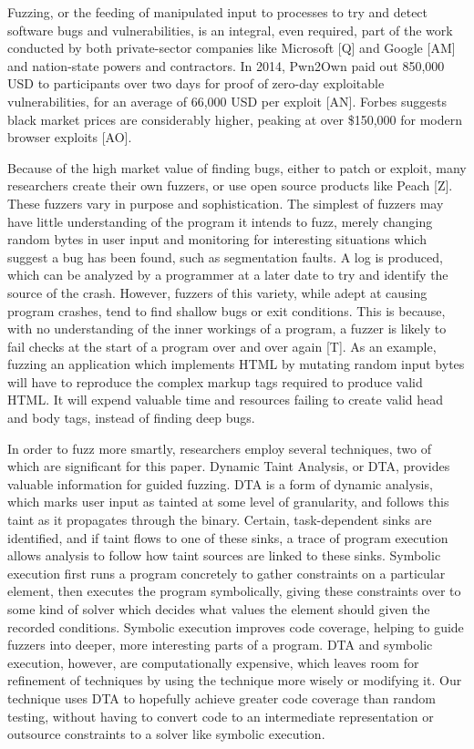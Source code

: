 \documentclass[11pt,expanded,copyright]{fsuthesis}
\begin{document}
Fuzzing, or the feeding of manipulated input to processes to try and detect software bugs and vulnerabilities, is an integral, even required, part of the work conducted by both private-sector companies like Microsoft [Q] and Google [AM] and nation-state powers and contractors. In 2014, Pwn2Own paid out 850,000 USD to participants over two days for proof of zero-day exploitable vulnerabilities, for an average of 66,000 USD per exploit [AN]. Forbes suggests black market prices are considerably higher, peaking at over \$150,000 for modern browser exploits [AO].

Because of the high market value of finding bugs, either to patch or exploit, many researchers create their own fuzzers, or use open source products like Peach [Z]. These fuzzers vary in purpose and sophistication. The simplest of fuzzers may have little understanding of the program it intends to fuzz, merely changing random bytes in user input and monitoring for interesting situations which suggest a bug has been found, such as segmentation faults. A log is produced, which can be analyzed by a programmer at a later date to try and identify the source of the crash. However, fuzzers of this variety, while adept at causing program crashes, tend to find shallow bugs or exit conditions. This is because, with no understanding of the inner workings of a program, a fuzzer is likely to fail checks at the start of a program over and over again [T]. As an example, fuzzing an application which implements HTML by mutating random input bytes will have to reproduce the complex markup tags required to produce valid HTML. It will expend valuable time and resources failing to create valid head and body tags, instead of finding deep bugs.

In order to fuzz more smartly, researchers employ several techniques, two of which are significant for this paper. Dynamic Taint Analysis, or DTA, provides valuable information for guided fuzzing. DTA is a form of dynamic analysis, which marks user input as tainted at some level of granularity, and follows this taint as it propagates through the binary. Certain, task-dependent sinks are identified, and if taint flows to one of these sinks, a trace of program execution allows analysis to follow how taint sources are linked to these sinks. Symbolic execution first runs a program concretely to gather constraints on a particular element, then executes the program symbolically, giving these constraints over to some kind of solver which decides what values the element should given the recorded conditions. Symbolic execution improves code coverage, helping to guide fuzzers into deeper, more interesting parts of a program. DTA and symbolic execution, however, are computationally expensive, which leaves room for refinement of techniques by using the technique more wisely or modifying it. Our technique uses DTA to hopefully achieve greater code coverage than random testing, without having to convert code to an intermediate representation or outsource constraints to a solver like symbolic execution.
\end{document}
